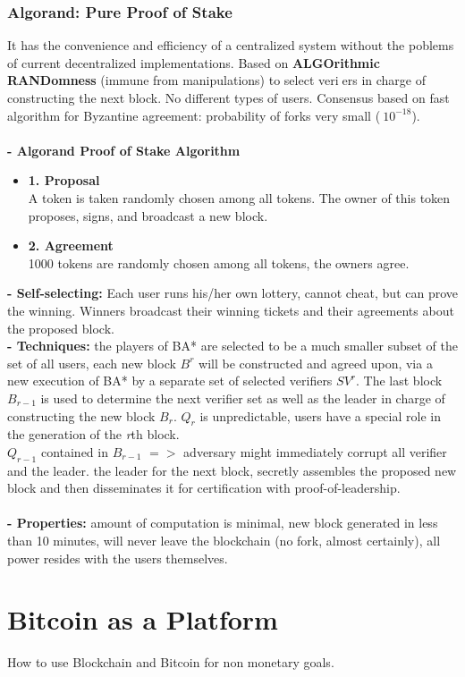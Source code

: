 \documentclass{article}
\begin{document}
\subsubsection{Algorand: Pure Proof of Stake}
It has the convenience and efficiency of a centralized system without the poblems of current decentralized implementations. Based on \textbf{ALGOrithmic RANDomness }(immune from manipulations) to select veriers in charge of constructing the next block. No different types of users. Consensus based on fast algorithm for Byzantine agreement: probability of forks very small ($~ 10^{-18}$).\\\\
\textbf{- Algorand Proof of Stake Algorithm}
\begin{itemize}
\item \textbf{1. Proposal}\\
A token is taken randomly chosen among all tokens. The owner of this token proposes, signs, and broadcast a new block.
\item \textbf{2. Agreement}\\
1000 tokens are randomly chosen among all tokens, the owners agree.
\end{itemize}
\textbf{- Self-selecting: }Each user runs his/her own lottery, cannot cheat, but can prove the winning. Winners broadcast their winning tickets and their agreements about the proposed block.\\
\textbf{- Techniques: }the players of BA* are selected to be a much smaller subset of the set of all users, each new block $B^r$ will be constructed and agreed upon, via a new execution of BA* by a separate set of selected verifiers $SV^r$. The last block $B_{r-1}$ is used to determine the next verifier set as well as the leader in charge of constructing the new block $B_r$. $Q_r$ is unpredictable, users have a special role in the generation of the \textit{r}th block.\\
$Q_{r-1}$ contained in $B_{r-1}$ $=>$ adversary might immediately corrupt all verifier and the leader. the leader for the next block, secretly assembles the proposed new block and then disseminates it for certification with proof-of-leadership.\\\\
\textbf{- Properties: }amount of computation is minimal, new block generated in less than 10 minutes, will never leave the blockchain (no fork, almost certainly), all power resides with the users themselves.
\newpage

\section{Bitcoin as a Platform}
How to use Blockchain and Bitcoin for non monetary goals.\\
\end{document}
